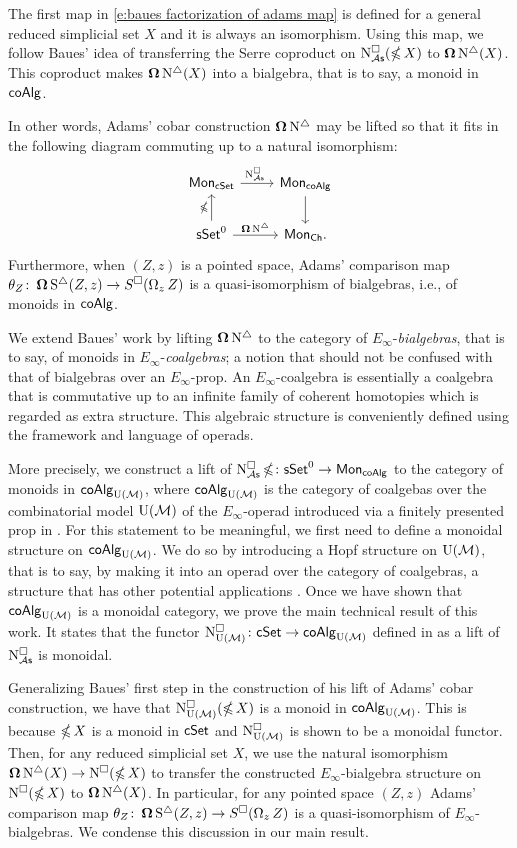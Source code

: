The first map in \eqref{e:baues factorization of adams map} is defined for a general reduced simplicial set $X$ and it is always an isomorphism.
Using this map, we follow Baues' idea of transferring the Serre coproduct on $\operatorname{N^{\square}_{{\mathcal{A}\mathsf{s}}}}(\operatorname{\mathbb{\Omega}} X)$ to $\operatorname{\mathbf{\Omega}} \operatorname{N^{\triangle}}(X)$. This coproduct makes $\operatorname{\mathbf{\Omega}} \operatorname{N^{\triangle}}(X)$ into a bialgebra, that is to say, a monoid in $\mathsf{coAlg}$.

In other words,  Adams' cobar construction $\operatorname{\mathbf{\Omega}} \operatorname{N^{\triangle}}$ may be lifted so that it fits in the following diagram commuting up to a natural isomorphism:
\[
\begin{tikzcd}
\Mon_{\cSet} \arrow[r, "\cchainsAs \ "] & \Mon_{\coAlg} \arrow[d] \\
\sSet^0 \arrow[r, "\cobar \schains"] \arrow[u, "\ccobar"] & \Mon_{\Ch}.
\end{tikzcd}
\]
Furthermore, when $(Z, z)$ is a pointed space, Adams' comparison map $\theta_Z \colon \operatorname{\mathbf{\Omega}} \operatorname{S^{\triangle}}(Z, z) \to S^{\square}(\operatorname{\Omega}_z Z)$ is a quasi-isomorphism of bialgebras, i.e., of monoids in $\mathsf{coAlg}$.

We extend Baues' work by lifting $\operatorname{\mathbf{\Omega}} \operatorname{N^{\triangle}}$ to the category of $E_{\infty}$-\textit{bialgebras}, that is to say, of monoids in $E_{\infty}$-\textit{coalgebras}; a notion that should not be confused with that of bialgebras over an $E_{\infty}$-prop. An $E_{\infty}$-coalgebra is essentially a coalgebra that is commutative up to an infinite family of coherent homotopies which is regarded as extra structure. This algebraic structure is conveniently defined using the framework and language of operads. 

More precisely, we construct a lift of $\operatorname{N^{\square}_{{\mathcal{A}\mathsf{s}}}} \operatorname{\mathbb{\Omega}} \colon \mathsf{sSet}^0 \to \mathsf{Mon}_{\mathsf{coAlg}}$ to the category of monoids in $\mathsf{coAlg}_{\operatorname{U}(\mathcal{M})}$, where $\mathsf{coAlg}_{\operatorname{U}(\mathcal{M})}$ is the category of coalgebas over the combinatorial model ${\operatorname{U}(\mathcal{M})}$ of the $E_{\infty}$-operad introduced via a finitely presented prop in \cite{medina2020prop1}.
For this statement to be meaningful, we first need to define a monoidal structure on $\mathsf{coAlg}_{\operatorname{U}(\mathcal{M})}$.
We do so by introducing a Hopf structure on ${\operatorname{U}(\mathcal{M})}$, that is to say, by making it into an operad over the category of coalgebras, a structure that has other potential applications \cite{livernet2008hopf}.
Once we have shown that $\mathsf{coAlg}_{\operatorname{U}(\mathcal{M})}$ is a monoidal category, we prove the main technical result of this work.
It states that the functor $\operatorname{N^{\square}_{{\operatorname{U}(\mathcal{M})}}} \colon \mathsf{cSet} \to \mathsf{coAlg}_{\operatorname{U}(\mathcal{M})}$ defined in \cite{medina2021cubical} as a lift of $\operatorname{N^{\square}_{{\mathcal{A}\mathsf{s}}}}$ is monoidal.

Generalizing Baues' first step in the construction of his lift of Adams' cobar construction, we have that $\operatorname{N^{\square}_{{\operatorname{U}(\mathcal{M})}}}(\operatorname{\mathbb{\Omega}} X)$ is a monoid in $\mathsf{coAlg}_{\operatorname{U}(\mathcal{M})}$.
This is because $\operatorname{\mathbb{\Omega}} X$ is a monoid in $\mathsf{cSet}$ and $\operatorname{N^{\square}_{{\operatorname{U}(\mathcal{M})}}}$ is shown to be a monoidal functor. Then, for any reduced simplicial set $X$, we use the natural isomorphism $\operatorname{\mathbf{\Omega}} \operatorname{N^{\triangle}}(X) \to \operatorname{N^{\square}}(\operatorname{\mathbb{\Omega}} X)$ to transfer the constructed $E_{\infty}$-bialgebra structure on $\operatorname{N^{\square}}(\operatorname{\mathbb{\Omega}} X)$ to $\operatorname{\mathbf{\Omega}} \operatorname{N^{\triangle}}(X)$.
In particular, for any pointed space $(Z, z)$ Adams' comparison map $\theta_Z \colon \operatorname{\mathbf{\Omega}} \operatorname{S^{\triangle}}(Z, z) \to S^{\square}(\operatorname{\Omega}_z Z)$ is a quasi-isomorphism of $E_{\infty}$-bialgebras.
We condense this discussion in our main result.

